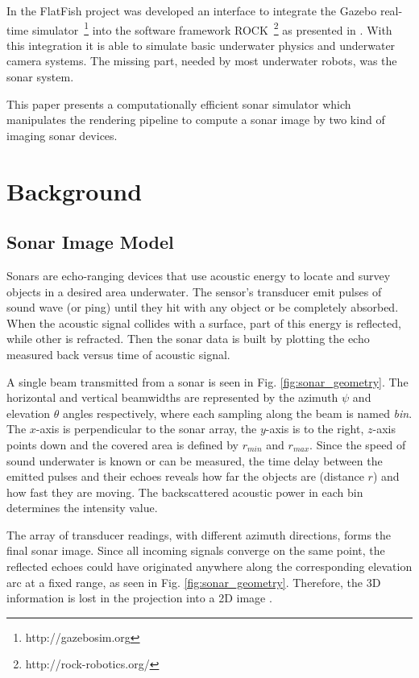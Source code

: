 \documentclass[final,5p,times]{elsarticle}
\begin{document}
In the FlatFish project \cite{albiez2015} was developed an interface to integrate the Gazebo real-time simulator~\footnote{http://gazebosim.org} into the software framework ROCK~\footnote{http://rock-robotics.org/} as presented in \cite{watanabe2015}. With this integration it is able to simulate basic underwater physics and underwater camera systems. The missing part, needed by most underwater robots, was the sonar system.

This paper presents a computationally efficient sonar simulator which manipulates the rendering pipeline to compute a sonar image by two kind of imaging sonar devices.


\section{Background}
\label{background}

\subsection{Sonar Image Model}
\label{sonar:model}

Sonars are echo-ranging devices that use acoustic energy to locate and survey objects in a desired area underwater. The sensor's transducer emit pulses of sound wave (or ping) until they hit with any object or be completely absorbed. When the acoustic signal collides with a surface, part of this energy is reflected, while other is refracted. Then the sonar data is built by plotting the echo measured back versus time of acoustic signal.

A single beam transmitted from a sonar is seen in Fig. \ref{fig:sonar_geometry}. The horizontal and vertical beamwidths are represented by the azimuth $\psi$ and elevation $\theta$ angles respectively, where each sampling along the beam is named \textit{bin}. The $x$-axis is perpendicular to the sonar array, the $y$-axis is to the right, $z$-axis points down and the covered area is defined by $r_{min}$ and $r_{max}$. Since the speed of sound underwater is known or can be measured, the time delay between the emitted pulses and their echoes reveals how far the objects are (distance $r$) and how fast they are moving. The backscattered acoustic power in each bin determines the intensity value.

The array of transducer readings, with different azimuth directions, forms the final sonar image. Since all incoming signals converge on the same point, the reflected echoes could have originated anywhere along the corresponding elevation arc at a fixed range, as seen in Fig. \ref{fig:sonar_geometry}. Therefore, the 3D information is lost in the projection into a 2D image \cite{huang2015}.
\end{document}
